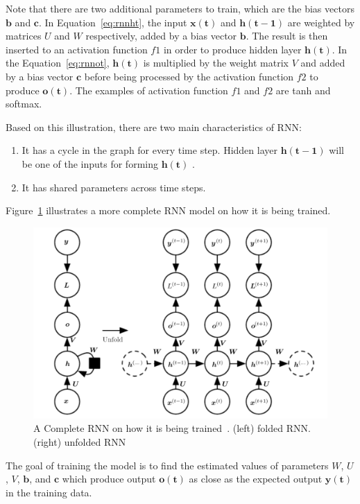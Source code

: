 Note that there are two additional parameters to train, which are the bias vectors $\mathbf{b}$ and $\mathbf{c}$. In Equation~\ref{eq:rnnht}, the input $\mathbf{x(t)}$ and $\mathbf{h(t-1)}$ are weighted by matrices $U$ and $W$ respectively, added by a bias vector $\mathbf{b}$. The result is then inserted to an activation function $f1$ in order to produce hidden layer $\mathbf{h(t)}$. In the Equation~\ref{eq:rnnot}, $\mathbf{h(t)}$ is multiplied by the weight matrix $V$ and added by a bias vector $\mathbf{c}$ before being processed by the activation function $f2$ to produce $\mathbf{o(t)}$. The examples of activation function $f1$ and $f2$ are tanh and softmax.

Based on this illustration, there are two main characteristics of RNN:
\begin{enumerate}
	\item It has a cycle in the graph for every time step. Hidden layer $\mathbf{h(t-1)}$  will be one of the inputs for forming $\mathbf{h(t)}$ .
	\item It has shared parameters across time steps.
\end{enumerate}

Figure~\ref{fig:fulrnn} illustrates a more complete RNN model on how it is being trained.

\begin{figure}
	\centering
	\includegraphics[width=0.80\linewidth]{images/fullrnn}
	\caption{A Complete RNN on how it is being trained~\citep{Goodfellow-et-al-2016-Book}. (left) folded RNN. (right) unfolded RNN}
	\label{fig:fulrnn}
\end{figure}

The goal of training the model is to find the estimated values of parameters $W$, $U$, $V$, $\mathbf{b}$, and $\mathbf{c}$ which produce output $\mathbf{o(t)}$ as close as the expected output $\mathbf{y(t)}$ in the training data. 

